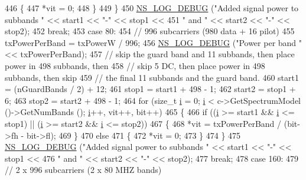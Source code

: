 \begin{DoxyCode}
446             \{
447               *vit = 0;
448             \}
449         \}
450       \hyperlink{group__logging_ga413f1886406d49f59a6a0a89b77b4d0a}{NS\_LOG\_DEBUG} (\textcolor{stringliteral}{"Added signal power to subbands "} << start1 << \textcolor{stringliteral}{"-"} << stop1 <<
451                     \textcolor{stringliteral}{" and "} << start2 << \textcolor{stringliteral}{"-"} << stop2);
452       \textcolor{keywordflow}{break};
453     \textcolor{keywordflow}{case} 80:
454       \textcolor{comment}{// 996 subcarriers (980 data + 16 pilot)}
455       txPowerPerBand = txPowerW / 996;
456       \hyperlink{group__logging_ga413f1886406d49f59a6a0a89b77b4d0a}{NS\_LOG\_DEBUG} (\textcolor{stringliteral}{"Power per band "} << txPowerPerBand);
457       \textcolor{comment}{// skip the guard band and 11 subbands, then place power in 498 subbands, then}
458       \textcolor{comment}{// skip 5 DC, then place power in 498 subbands, then skip}
459       \textcolor{comment}{// the final 11 subbands and the guard band.}
460       start1 = (nGuardBands / 2) + 12;
461       stop1 = start1 + 498 - 1;
462       start2 = stop1 + 6;
463       stop2 = start2 + 498 - 1;
464       \textcolor{keywordflow}{for} (\textcolor{keywordtype}{size\_t} \hyperlink{bernuolliDistribution_8m_a6f6ccfcf58b31cb6412107d9d5281426}{i} = 0; \hyperlink{bernuolliDistribution_8m_a6f6ccfcf58b31cb6412107d9d5281426}{i} < c->GetSpectrumModel ()->GetNumBands (); \hyperlink{bernuolliDistribution_8m_a6f6ccfcf58b31cb6412107d9d5281426}{i}++, vit++, bit++)
465         \{
466           \textcolor{keywordflow}{if} ((\hyperlink{bernuolliDistribution_8m_a6f6ccfcf58b31cb6412107d9d5281426}{i} >= start1 && \hyperlink{bernuolliDistribution_8m_a6f6ccfcf58b31cb6412107d9d5281426}{i} <= stop1) || (\hyperlink{bernuolliDistribution_8m_a6f6ccfcf58b31cb6412107d9d5281426}{i} >= start2 && \hyperlink{bernuolliDistribution_8m_a6f6ccfcf58b31cb6412107d9d5281426}{i} <= stop2))
467             \{
468               *vit = txPowerPerBand / (bit->fh - bit->fl);
469             \}
470           \textcolor{keywordflow}{else}
471             \{
472               *vit = 0;
473             \}
474         \}
475       \hyperlink{group__logging_ga413f1886406d49f59a6a0a89b77b4d0a}{NS\_LOG\_DEBUG} (\textcolor{stringliteral}{"Added signal power to subbands "} << start1 << \textcolor{stringliteral}{"-"} << stop1 <<
476                     \textcolor{stringliteral}{" and "} << start2 << \textcolor{stringliteral}{"-"} << stop2);
477       \textcolor{keywordflow}{break};
478     \textcolor{keywordflow}{case} 160:
479       \textcolor{comment}{// 2 x 996 subcarriers (2 x 80 MHZ bands)}

\end{DoxyCode}

